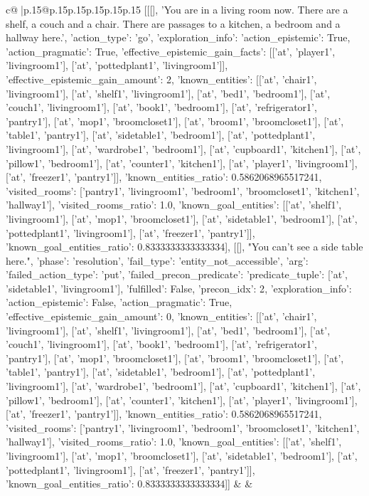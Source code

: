 \documentclass{article}
\begin{document}
{\begin{supertabular}{c@{$\;$}|p{.15\linewidth}@{}p{.15\linewidth}p{.15\linewidth}p{.15\linewidth}p{.15\linewidth}p{.15\linewidth}}
{{{	 [[[], 'You are in a living room now. There are a shelf, a couch and a chair. There are passages to a kitchen, a bedroom and a hallway here.', {'action_type': 'go', 'exploration_info': {'action_epistemic': True, 'action_pragmatic': True, 'effective_epistemic_gain_facts': [['at', 'player1', 'livingroom1'], ['at', 'pottedplant1', 'livingroom1']], 'effective_epistemic_gain_amount': 2, 'known_entities': [['at', 'chair1', 'livingroom1'], ['at', 'shelf1', 'livingroom1'], ['at', 'bed1', 'bedroom1'], ['at', 'couch1', 'livingroom1'], ['at', 'book1', 'bedroom1'], ['at', 'refrigerator1', 'pantry1'], ['at', 'mop1', 'broomcloset1'], ['at', 'broom1', 'broomcloset1'], ['at', 'table1', 'pantry1'], ['at', 'sidetable1', 'bedroom1'], ['at', 'pottedplant1', 'livingroom1'], ['at', 'wardrobe1', 'bedroom1'], ['at', 'cupboard1', 'kitchen1'], ['at', 'pillow1', 'bedroom1'], ['at', 'counter1', 'kitchen1'], ['at', 'player1', 'livingroom1'], ['at', 'freezer1', 'pantry1']], 'known_entities_ratio': 0.5862068965517241, 'visited_rooms': ['pantry1', 'livingroom1', 'bedroom1', 'broomcloset1', 'kitchen1', 'hallway1'], 'visited_rooms_ratio': 1.0, 'known_goal_entities': [['at', 'shelf1', 'livingroom1'], ['at', 'mop1', 'broomcloset1'], ['at', 'sidetable1', 'bedroom1'], ['at', 'pottedplant1', 'livingroom1'], ['at', 'freezer1', 'pantry1']], 'known_goal_entities_ratio': 0.8333333333333334}}], [[], "You can't see a side table here.", {'phase': 'resolution', 'fail_type': 'entity_not_accessible', 'arg': {'failed_action_type': 'put', 'failed_precon_predicate': {'predicate_tuple': ['at', 'sidetable1', 'livingroom1'], 'fulfilled': False, 'precon_idx': 2}}, 'exploration_info': {'action_epistemic': False, 'action_pragmatic': True, 'effective_epistemic_gain_amount': 0, 'known_entities': [['at', 'chair1', 'livingroom1'], ['at', 'shelf1', 'livingroom1'], ['at', 'bed1', 'bedroom1'], ['at', 'couch1', 'livingroom1'], ['at', 'book1', 'bedroom1'], ['at', 'refrigerator1', 'pantry1'], ['at', 'mop1', 'broomcloset1'], ['at', 'broom1', 'broomcloset1'], ['at', 'table1', 'pantry1'], ['at', 'sidetable1', 'bedroom1'], ['at', 'pottedplant1', 'livingroom1'], ['at', 'wardrobe1', 'bedroom1'], ['at', 'cupboard1', 'kitchen1'], ['at', 'pillow1', 'bedroom1'], ['at', 'counter1', 'kitchen1'], ['at', 'player1', 'livingroom1'], ['at', 'freezer1', 'pantry1']], 'known_entities_ratio': 0.5862068965517241, 'visited_rooms': ['pantry1', 'livingroom1', 'bedroom1', 'broomcloset1', 'kitchen1', 'hallway1'], 'visited_rooms_ratio': 1.0, 'known_goal_entities': [['at', 'shelf1', 'livingroom1'], ['at', 'mop1', 'broomcloset1'], ['at', 'sidetable1', 'bedroom1'], ['at', 'pottedplant1', 'livingroom1'], ['at', 'freezer1', 'pantry1']], 'known_goal_entities_ratio': 0.8333333333333334}}]] 
	  } 
	   } 
	   } 
	 & & \\ 
 


\end{supertabular}}
\end{document}

